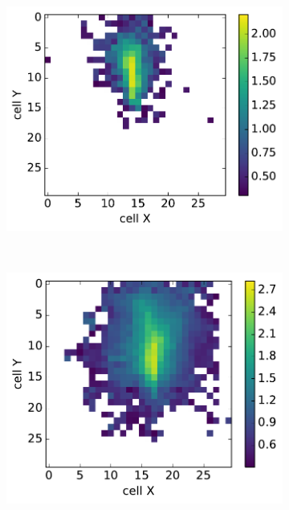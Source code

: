 \begin{figure}
\begin{subfigure}{0.24\textwidth}
  \end{subfigure}
  \begin{subfigure}{0.24\textwidth}
    \centering
    \includegraphics[width=1\textwidth]{figures/4_real.pdf}
  \end{subfigure}\\
   \begin{subfigure}{0.24\textwidth}
    \centering
    \includegraphics[width=1\textwidth]{figures/1_gen.pdf}

\end{subfigure}
\end{figure}

